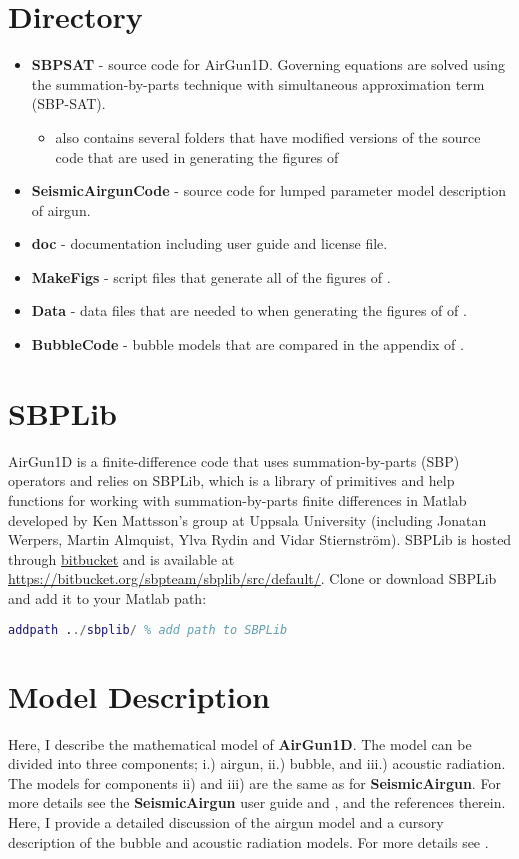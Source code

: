 \documentclass[10pt]{article}
\begin{document}
\section{Directory}
\begin{itemize}
\item{\bf SBPSAT} - source code for AirGun1D. Governing equations are solved using the summation-by-parts technique with simultaneous approximation term (SBP-SAT).
\begin{itemize}
\item also contains several folders that have modified versions of the source code that are used in generating the figures of \citet{Watson2019_airgun}
\end{itemize}
\item {\bf SeismicAirgunCode} - source code for lumped parameter model description of airgun.
\item {\bf doc} - documentation including user guide and license file.
\item {\bf MakeFigs} - script files that generate all of the figures of \citet{Watson2019_airgun}.
\item {\bf Data} - data files that are needed to when generating the figures of of \citet{Watson2019_airgun}.
\item {\bf BubbleCode} - bubble models that are compared in the appendix of \citet{Watson2019_airgun}.
\end{itemize}

\section{SBPLib}
AirGun1D is a finite-difference code that uses summation-by-parts (SBP) operators \cite{Svard2014} and relies on SBPLib, which is a library of primitives and help functions for working with summation-by-parts finite differences in Matlab developed by Ken Mattsson's group at Uppsala University (including Jonatan Werpers, Martin Almquist, Ylva Rydin and Vidar Stiernstr\"{o}m). SBPLib is hosted through \href{https:bitbucket.org}{bitbucket} and is available at \href{https://bitbucket.org/sbpteam/sbplib/src/default/}{https://bitbucket.org/sbpteam/sbplib/src/default/}. Clone or download SBPLib and add it to your Matlab path:
\begin{lstlisting}[language=Matlab]
addpath ../sbplib/ % add path to SBPLib
\end{lstlisting}

\section{Model Description}
Here, I describe the mathematical model of {\bf AirGun1D}. The model can be divided into three components; i.) airgun, ii.) bubble, and iii.) acoustic radiation. The models for components ii) and iii) are the same as for {\bf SeismicAirgun}. For more details see the {\bf SeismicAirgun} user guide and \citet{Chelminski2019}, \citet{Watson2016} and the references therein. Here, I provide a detailed discussion of the airgun model and a cursory description of the bubble and acoustic radiation models. For more details see \citet{Watson2019_airgun}.
\end{document}

